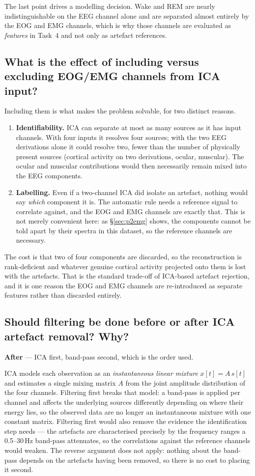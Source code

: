 \documentclass[11pt,a4paper]{article}
\newcommand{\hertz}{Hz}
\newcommand{\SIrange}[3]{#1--#2\,#3}
\newcommand{\Q}[1]{\subsection*{#1}}
\begin{document}
The last point drives a modelling decision. Wake and REM are nearly indistinguishable on the
EEG channel alone and are separated almost entirely by the EOG and EMG channels, which is why
those channels are evaluated as \emph{features} in Task~4 and not only as artefact references.

\Q{What is the effect of including versus excluding EOG/EMG channels from ICA input?}

Including them is what makes the problem solvable, for two distinct reasons.

\begin{enumerate}
  \item \textbf{Identifiability.} ICA can separate at most as many sources as it has input
        channels. With four inputs it resolves four sources; with the two EEG derivations alone
        it could resolve two, fewer than the number of physically present sources (cortical
        activity on two derivations, ocular, muscular). The ocular and muscular contributions
        would then necessarily remain mixed into the EEG components.
  \item \textbf{Labelling.} Even if a two-channel ICA did isolate an artefact, nothing would
        say \emph{which} component it is. The automatic rule needs a reference signal to
        correlate against, and the EOG and EMG channels are exactly that. This is not merely
        convenient here: as \S\ref{sec:p2emg} shows, the components cannot be told apart by
        their spectra in this dataset, so the reference channels are necessary.
\end{enumerate}

The cost is that two of four components are discarded, so the reconstruction is rank-deficient
and whatever genuine cortical activity projected onto them is lost with the artefacts. That is
the standard trade-off of ICA-based artefact rejection, and it is one reason the EOG and EMG
channels are re-introduced as separate features rather than discarded entirely.

\Q{Should filtering be done before or after ICA artefact removal? Why?}

\textbf{After} --- ICA first, band-pass second, which is the order used.

ICA models each observation as an \emph{instantaneous linear mixture} $x[t]=A\,s[t]$ and
estimates a single mixing matrix $A$ from the joint amplitude distribution of the four
channels. Filtering first breaks that model: a band-pass is applied per channel and affects the
underlying sources differently depending on where their energy lies, so the observed data are
no longer an instantaneous mixture with one constant matrix. Filtering first would also remove
the evidence the identification step needs --- the artefacts are characterised precisely by the
frequency ranges a \SIrange{0.5}{30}{\hertz} band-pass attenuates, so the correlations against
the reference channels would weaken. The reverse argument does not apply: nothing about the
band-pass depends on the artefacts having been removed, so there is no cost to placing it
second.
\end{document}
